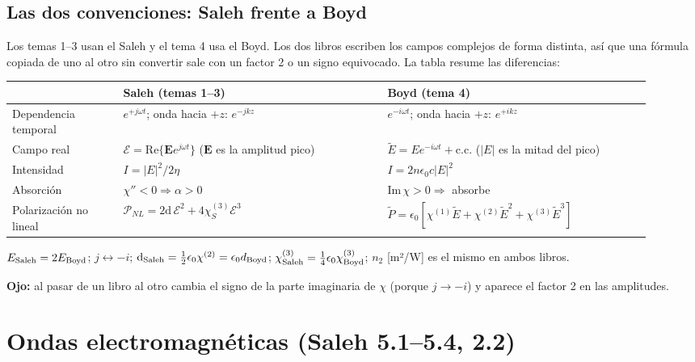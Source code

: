 \documentclass[10pt]{article}
\newcommand{\Ec}{\boldsymbol{\mathcal E}}
\newcommand{\E}{\mathbf E}
\newcommand{\cc}{\text{c.c.}}
\newcommand{\ojo}[1]{{\color{alerta}\textbf{Ojo:} #1}}
\begin{document}
\subsection*{Las dos convenciones: Saleh frente a Boyd}
Los temas 1–3 usan el Saleh y el tema 4 usa el Boyd. Los dos libros escriben los campos complejos de forma distinta, así que una fórmula copiada de uno al otro sin convertir sale con un factor 2 o un signo equivocado. La tabla resume las diferencias:

\begin{center}
\renewcommand{\arraystretch}{1.35}
\begin{tabular}{@{}p{0.16\linewidth}p{0.38\linewidth}p{0.38\linewidth}@{}}
\toprule
 & \textbf{Saleh (temas 1–3)} & \textbf{Boyd (tema 4)}\\\midrule
Dependencia temporal & $e^{+j\omega t}$; onda hacia $+z$: $e^{-jkz}$ & $e^{-i\omega t}$; onda hacia $+z$: $e^{+ikz}$\\
Campo real & $\Ec=\mathrm{Re}\{\E e^{j\omega t}\}$ ($\E$ es la amplitud pico) & $\tilde E=Ee^{-i\omega t}+\cc$ ($|E|$ es la mitad del pico)\\
Intensidad & $I=|E|^2/2\eta$ & $I=2n\epsilon_0c|E|^2$\\
Absorción & $\chi''<0\Rightarrow\alpha>0$ & $\mathrm{Im}\,\chi>0\Rightarrow$ absorbe\\
Polarización no lineal & $\mathcal P_{NL}=2\mathrm d\,\mathcal E^2+4\chi^{(3)}_S\mathcal E^3$ & $\tilde P=\epsilon_0[\chi^{(1)}\tilde E+\chi^{(2)}\tilde E^2+\chi^{(3)}\tilde E^3]$\\
\bottomrule
\end{tabular}
\end{center}

\begin{clave}[title={Equivalencias}]
$E_{\rm Saleh}=2E_{\rm Boyd}$; \quad $j\leftrightarrow -i$; \quad $\mathrm d_{\rm Saleh}=\tfrac12\epsilon_0\chi^{(2)}=\epsilon_0d_{\rm Boyd}$; \quad
$\chi^{(3)}_{\rm Saleh}=\tfrac14\epsilon_0\chi^{(3)}_{\rm Boyd}$; \quad $n_2$ [m²/W] es el mismo en ambos libros.
\end{clave}
\ojo{al pasar de un libro al otro cambia el signo de la parte imaginaria de $\chi$ (porque $j\to-i$) y aparece el factor 2 en las amplitudes.}

\section{Ondas electromagnéticas (Saleh 5.1–5.4, 2.2)}
\end{document}
